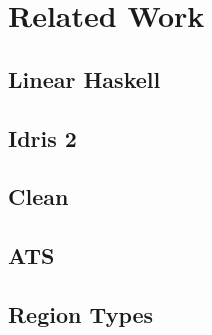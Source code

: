 \chapter{Related Work}\label{sec:relatedwork}

\section{Linear Haskell}

\section{Idris 2}

\section{Clean}

\section{ATS}

\section{Region Types}